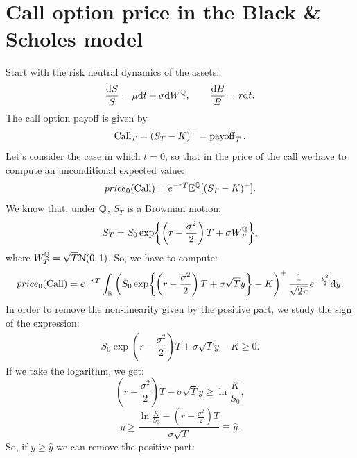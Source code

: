 \section{Call option price in the Black \& Scholes model}
Start with the risk neutral dynamics of the assets:
\begin{equation}
    \frac{\dd S}{S} = \mu\dd t + \sigma \dd W^{\mathbb{Q}}, \qquad \frac{\dd B}{B} = r\dd t.
\end{equation}
The call option payoff is given by
\begin{equation}
    \operatorname{Call}_T = (S_T - K)^+ = \operatorname{payoff}_T.
\end{equation}
Let's consider the case in which $t=0$, so that in the price of the call we have to compute an unconditional expected value:
\begin{equation}
    price_0(\operatorname{Call}) = e^{-rT}\mathbb{E}^{\mathbb{Q}}[(S_T-K)^+].
\end{equation}
We know that, under $\mathbb{Q}$, $S_T$ is a Brownian motion:
\begin{equation}
    S_T = S_0\exp{\left(r-\dfrac{\sigma^2}{2}\right)T+\sigma W_T^{\mathbb{Q}}},
\end{equation}
where $W_T^{\mathbb{Q}}=\sqrt{T}\mathcal{N}(0,1)$. So, we have to compute:
\begin{equation}
    price_0(\operatorname{Call}) = e^{-rT}\int_{\mathbb{R}}\left(S_0\exp{\left(r-\dfrac{\sigma^2}{2}\right)T+\sigma \sqrt{T}y}-K\right)^+\frac{1}{\sqrt{2\pi}}e^{-\frac{y^2}{2}}\dd y.
\end{equation}
In order to remove the non-linearity given by the positive part, we study the sign of the expression:
\begin{align}
    S_0\exp{\left(r-\dfrac{\sigma^2}{2}\right)T+\sigma \sqrt{T}y}-K \ge 0.
\end{align}
If we take the logarithm, we get:
\begin{equation*}
    \left(r-\dfrac{\sigma^2}{2}\right)T+\sigma \sqrt{T}y \ge \ln\frac{K}{S_0},
\end{equation*}
\begin{equation*}
    y \ge \dfrac{\ln\frac{K}{S_0} - \left(r-\frac{\sigma^2}{2}\right)T}{\sigma\sqrt{T}} \equiv \hat{y}.
\end{equation*}
So, if $y\ge\hat{y}$ we can remove the positive part:
